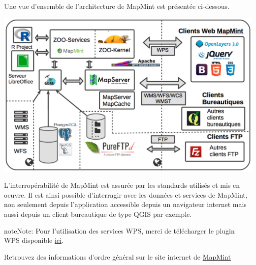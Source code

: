 \documentclass[letterpaper,10pt,french]{sphinxmanual}
\begin{document}
Une vue d'ensemble de l'architecture de MapMint est présentée
ci-dessous.

\includegraphics{mapmint-arch.png}

L'interropérabilité de MapMint est assurée par les standards utilisés
et mis en oeuvre. Il est ainsi possible d'interragir avec les données
et services de MapMint, non seulement depuis l'application accessible
depuis un navigateur internet mais aussi depuis un client bureautique
de type QGIS par exemple.

\begin{notice}{note}{Note:}
Pour l'utilisation des services WPS, merci de télécharger le plugin
WPS disponible \href{http://geolabs.fr/plugins.xml}{ici}.
\end{notice}

Retrouvez des informations d'ordre général sur le site internet de \href{http://mapmint.com/en/}{MapMint}
\end{document}
